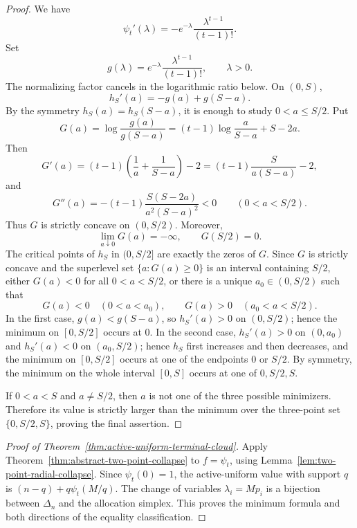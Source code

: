 \documentclass[11pt]{article}
\theoremstyle{definition}
\theoremstyle{remark}
\newcommand{\1}{\mathbf 1}
\begin{document}
\begin{proof}
We have
\[
  \psi_t'(\lambda)=-e^{-\lambda}\frac{\lambda^{t-1}}{(t-1)!}.
\]
Set
\[
  g(\lambda)=e^{-\lambda}\frac{\lambda^{t-1}}{(t-1)!},\qquad \lambda>0.
\]
The normalizing factor cancels in the logarithmic ratio below.  On \((0,S)\),
\[
  h_S'(a)=-g(a)+g(S-a).
\]
By the symmetry \(h_S(a)=h_S(S-a)\), it is enough to study \(0<a\le S/2\).  Put
\[
  G(a)=\log\frac{g(a)}{g(S-a)}
  =(t-1)\log\frac{a}{S-a}+S-2a.
\]
Then
\[
  G'(a)=(t-1)\left(\frac1a+\frac1{S-a}\right)-2
        =(t-1)\frac{S}{a(S-a)}-2,
\]
and
\[
  G''(a)=-(t-1)\frac{S(S-2a)}{a^2(S-a)^2}<0
  \qquad(0<a<S/2).
\]
Thus \(G\) is strictly concave on \((0,S/2)\).  Moreover,
\[
  \lim_{a\downarrow0}G(a)=-\infty,
  \qquad
  G(S/2)=0.
\]
The critical points of \(h_S\) in \((0,S/2]\) are exactly the zeros of \(G\).  Since \(G\) is strictly concave and the superlevel set \(\{a:G(a)\ge0\}\) is an interval containing \(S/2\), either \(G(a)<0\) for all \(0<a<S/2\), or there is a unique \(a_0\in(0,S/2)\) such that
\[
  G(a)<0\quad(0<a<a_0),
  \qquad
  G(a)>0\quad(a_0<a<S/2).
\]
In the first case, \(g(a)<g(S-a)\), so \(h_S'(a)>0\) on \((0,S/2)\); hence the minimum on \([0,S/2]\) occurs at \(0\).  In the second case, \(h_S'(a)>0\) on \((0,a_0)\) and \(h_S'(a)<0\) on \((a_0,S/2)\); hence \(h_S\) first increases and then decreases, and the minimum on \([0,S/2]\) occurs at one of the endpoints \(0\) or \(S/2\).  By symmetry, the minimum on the whole interval \([0,S]\) occurs at one of \(0,S/2,S\).

If \(0<a<S\) and \(a\ne S/2\), then \(a\) is not one of the three possible minimizers.  Therefore its value is strictly larger than the minimum over the three-point set \(\{0,S/2,S\}\), proving the final assertion.
\end{proof}

\begin{proof}[Proof of Theorem~\ref{thm:active-uniform-terminal-cloud}]
Apply Theorem~\ref{thm:abstract-two-point-collapse} to \(f=\psi_t\),
using Lemma~\ref{lem:two-point-radial-collapse}. Since \(\psi_t(0)=1\),
the active-uniform value with support \(q\) is
\((n-q)+q\psi_t(M/q)\). The change of variables
\(\lambda_i=Mp_i\) is a bijection between \(\Delta_n\) and the
allocation simplex. This proves the minimum formula and both directions
of the equality classification.
\end{proof}
\end{document}

